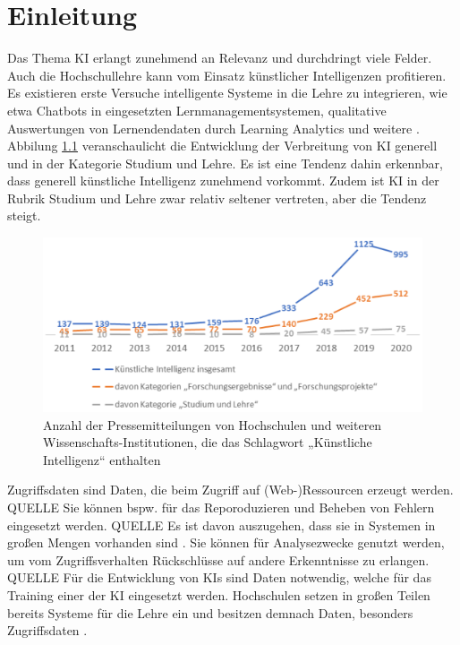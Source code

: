\chapter{Einleitung}
Das Thema \ac{KI} erlangt zunehmend an Relevanz und durchdringt viele Felder.
Auch die Hochschullehre kann vom Einsatz künstlicher Intelligenzen profitieren.
Es existieren erste Versuche intelligente Systeme in die Lehre zu integrieren, wie etwa Chatbots in eingesetzten Lernmanagementsystemen, qualitative Auswertungen von Lernendendaten durch Learning Analytics und weitere \cite*[S. 18, S. 14ff.]{Witt.2020}.
\\ \noindent
Abbilung \ref*{fig:entwickling_ki} veranschaulicht die Entwicklung der Verbreitung von \ac{KI} generell und in der Kategorie \glqq Studium und Lehre\grqq.
Es ist eine Tendenz dahin erkennbar, dass generell künstliche Intelligenz zunehmend vorkommt.
Zudem ist KI in der Rubrik Studium und Lehre zwar relativ seltener vertreten, aber die Tendenz steigt.
\begin{figure}[hbtp]
    \centering
    \includegraphics[width=.8\textwidth]{figures/entwicklung_historie_ki.png}
    \caption{Anzahl der Pressemitteilungen von Hochschulen und weiteren Wissenschafts-Institutionen, die das Schlagwort „Künstliche Intelligenz“ enthalten \cite*[S. 9]{Wannemacher.2021}}
    \label{fig:entwickling_ki}
\end{figure}
\noindent
Zugriffsdaten sind Daten, die beim Zugriff auf (Web-)Ressourcen erzeugt werden. QUELLE
Sie können bspw. für das Reporoduzieren und Beheben von Fehlern eingesetzt werden. QUELLE
Es ist davon auszugehen, dass sie in Systemen in großen Mengen vorhanden sind \cite[S. 3]{Quinn.2020}.
Sie können für Analysezwecke genutzt werden, um vom Zugriffsverhalten Rückschlüsse auf andere Erkenntnisse zu erlangen. QUELLE
\noindent
Für die Entwicklung von KIs sind Daten notwendig, welche für das Training einer der KI eingesetzt werden.
Hochschulen setzen in großen Teilen bereits Systeme für die Lehre ein und besitzen demnach Daten, besonders Zugriffsdaten \cite[S. 3]{Quinn.2020}.
